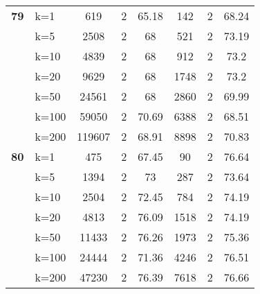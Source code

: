 \begin{table}[htbp]
\begin{tabular}{|l|l|c|c|c|c|c|c|}
    \multicolumn{1}{|r|}{\textbf{79}} & k=1 & 619 & 2 & 65.18 & 142 & 2 & 68.24 \\ 
     & k=5 & 2508 & 2 & 68 & 521 & 2 & 73.19 \\ 
     & k=10 & 4839 & 2 & 68 & 912 & 2 & 73.2 \\ 
     & k=20 & 9629 & 2 & 68 & 1748 & 2 & 73.2 \\ 
     & k=50 & 24561 & 2 & 68 & 2860 & 2 & 69.99 \\ 
     & k=100 & 59050 & 2 & 70.69 & 6388 & 2 & 68.51 \\ 
     & k=200 & 119607 & 2 & 68.91 & 8898 & 2 & 70.83 \\ \hline
    \multicolumn{1}{|r|}{\textbf{80}} & k=1 & 475 & 2 & 67.45 & 90 & 2 & 76.64 \\ 
     & k=5 & 1394 & 2 & 73 & 287 & 2 & 73.64 \\ 
     & k=10 & 2504 & 2 & 72.45 & 784 & 2 & 74.19 \\ 
     & k=20 & 4813 & 2 & 76.09 & 1518 & 2 & 74.19 \\ 
     & k=50 & 11433 & 2 & 76.26 & 1973 & 2 & 75.36 \\ 
     & k=100 & 24444 & 2 & 71.36 & 4246 & 2 & 76.51 \\ 
     & k=200 & 47230 & 2 & 76.39 & 7618 & 2 & 76.66 \\ \hline
    \end{tabular}
\end{table}
